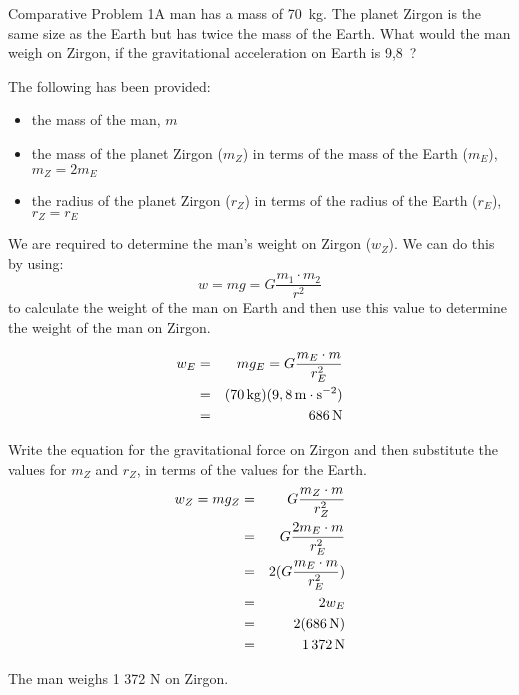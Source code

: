 \begin{wex}{Comparative Problem 1}{A man has a mass of 70~kg. The planet Zirgon is the same size as the Earth but has twice the mass of the Earth. What would the man weigh on Zirgon, if the gravitational acceleration on Earth is 9,8~\mss?}{
The following has been provided:
\begin{itemize}
\item the mass of the man, $m$
\item the mass of the planet Zirgon ($m_Z$) in terms of the mass of the Earth ($m_E$), $m_Z=2m_E$
\item the radius of the planet Zirgon ($r_Z$) in terms of the radius of the Earth ($r_E$), $r_Z=r_E$
\end{itemize}

We are required to determine the man's weight on Zirgon ($w_Z$). We can do this by using:
\begin{equation*}
w = mg = G\frac{m_1\cdot m_2}{r^2}
\end{equation*}
to calculate the weight of the man on Earth and then use this value to determine the weight of the man on Zirgon.

\begin{eqnarray*}
w_E &=& mg_E = G\frac{m_E \cdot m}{r_E^2}\\
&=&(70\,\mathrm{kg})(9,8\,\mathrm{m \cdot s^{-2}})\\
&=& 686\,\rm{N}
\end{eqnarray*}

Write the equation for the gravitational force on Zirgon and then substitute the values for $m_Z$ and $r_Z$, in terms of the values for the Earth.
\begin{eqnarray*}
w_Z = mg_Z &=& G\frac{m_Z\cdot m}{r_Z^2}\\
&=&G\frac{2m_E\cdot m}{r_E^2}\\
&=&2 (G\frac{m_E\cdot m}{r_E^2})\\
&=&2 w_E\\
&=&2(686\,\rm{N})\\
&=&1\,372\,\rm{N}
\end{eqnarray*}

The man weighs 1 372 N on Zirgon.}
\end{wex}


